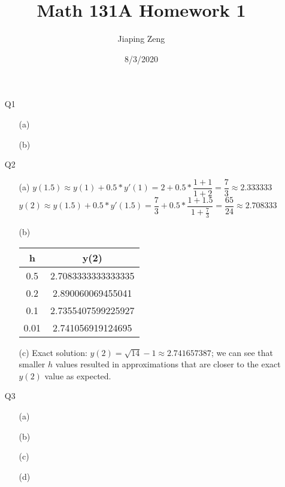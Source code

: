\documentclass{article}
\title{Math 131A Homework 1}
\date{8/3/2020}
\author{Jiaping Zeng}
\begin{document}
\maketitle

\begin{itemize}
	\item [Q1]
	      \begin{itemize}
		      \item [(a)]
		      \item [(b)]
	      \end{itemize}
	\item [Q2]
	      \begin{itemize}
		      \item [(a)] $y(1.5)\approx y(1)+0.5*y'(1)=2+0.5*\dfrac{1+1}{1+2}=\dfrac{7}{3}\approx 2.333333$\\$y(2)\approx y(1.5)+0.5*y'(1.5)=\dfrac{7}{3}+0.5*\dfrac{1+1.5}{1+\frac{7}{3}}=\boxed{\dfrac{65}{24}}\approx 2.708333$
		      \item [(b)]
		            \begin{tabular}{|c|c|}
			            \hline
			            h    & y(2)               \\
			            \hline
			            0.5  & 2.7083333333333335 \\
			            \hline
			            0.2  & 2.890060069455041  \\
			            \hline
			            0.1  & 2.7355407599225927 \\
			            \hline
			            0.01 & 2.741056919124695  \\
			            \hline
		            \end{tabular}
		      \item [(c)] Exact solution: $y(2)=\sqrt{14}-1\approx 2.741657387$; we can see that smaller $h$ values resulted in approximations that are closer to the exact $y(2)$ value as expected.
	      \end{itemize}
	\item [Q3]
	      \begin{itemize}
		      \item [(a)]
		      \item [(b)]
		      \item [(c)]
		      \item [(d)]
	      \end{itemize}
\end{itemize}
\end{document}
